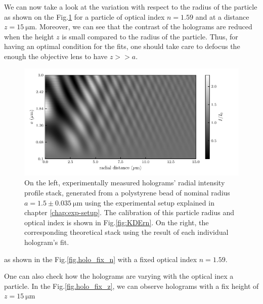 We can now take a look at the variation with respect to the radius of the particle as shown on the Fig.\ref{fig:holo_onlyr} for a particle of optical index $n = 1.59$ and at a distance $z = 15 ~\mathrm{\mu m }$. 
Moreover, we can see that the contrast of the holograms are reduced when the height $z$ is small compared to the radius of the particle. Thus, for having an optimal condition for the fits, one should take care to defocus the enough the objective lens to have $z >> a$.




\begin{figure}
	\centering
	\includegraphics{02_body/chapter2/images/holo_size_exemple/holos_only_r.pdf}
	\caption{On the left, experimentally measured  holograms' radial intensity profile stack, generated from a polystyrene bead of nominal radius $a = 1.5 \pm 0.035 ~ \mathrm{\mu m} $ using the experimental setup explained in chapter \ref{chap:exp-setup}. The calibration of this particle radius and optical index is shown in Fig.\ref{fig:KDErn}. On the right, the corresponding theoretical stack using the result of each individual hologram's fit.}
	\label{fig:holo_onlyr}
\end{figure}



as shown in the Fig.\ref{fig.holo_fix_n} with a fixed optical index $n = 1.59$. 

One can also check how the holograms are varying with the optical inex a particle. In the Fig.\ref{fig.holo_fix_z}, we can observe holograms with a fix height of $z=15 ~ \mathrm{\mu m}$ 


